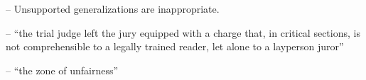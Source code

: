 

\newfontface{}
\newcommand\attribution[1]{\hspace{2pt}\fcc\tiny\rotatebox{90}{#1}}

\usepackage{tikz}
\usetikzlibrary{tikzmark, calc}
\newcommand\hlybox[2][]{\tikz[overlay]\node[fill=yellow!20,draw=black,inner sep=2pt, anchor=text, rectangle, rounded corners=1mm,#1] {#2};\phantom{#2}}

\usepackage[
final=true,
bookmarks,
            colorlinks=true,        
            citecolor=blue, 
            hyperindex=false,       
]{hyperref}


\usepackage{luacolor,lua-ul}
\newunderlinetype{}
\newcommand\underWavy[1]{{\beginUnderWavy#1}}



-- Unsupported generalizations are inappropriate.

-- ``the trial judge left the jury equipped with a charge that, in critical sections, is not comprehensible to a legally trained reader, let alone to a layperson juror''

-- ``the zone of unfairness''




\printbibliographymcgill

